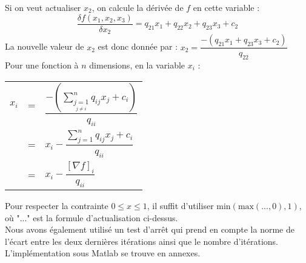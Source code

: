 \documentclass[12pt, a4paper]{report}
\begin{document}
Si on veut actualiser $x_2$, on calcule la dérivée de $f$ en cette variable :
\[\dfrac{\delta f(x_1,x_2,x_3)}{\delta x_2} = q_{21}x_1 + q_{22}x_2 + q_{23}x_3 + c_2\]
La nouvelle valeur de $x_2$ est donc donnée par :
\(x_2 = \dfrac{-(q_{21}x_1 + q_{23}x_3 + c_2)}{q_{22}}\) \\
Pour une fonction à $n$ dimensions, en la variable $x_i$ :\\
\begin{center}
\begin{tabular}{rcl}
$x_i$ & = & $\dfrac{-\left(\sum\limits_{\underset{j \neq i}{j = 1}}^n q_{ij}x_j + c_i\right)}{q_{ii}}$ \\
 & = & $x_i - \dfrac{\sum\limits_{j = 1}^nq_{ij}x_j + c_i}{q_{ii}}$ \\
 & = & $x_i - \dfrac{\left[\nabla f\right]_i}{q_{ii}}$ \\
\end{tabular}
\end{center}

Pour respecter la contrainte $0 \leq x \leq 1$, il suffit d'utiliser \(\text{min}(\text{max}(..., 0), 1)\), où "..." est la formule d'actualisation ci-dessus. \\

Nous avons également utilisé un test d'arrêt qui prend en compte la norme de l'écart entre les deux dernières itérations ainsi que le nombre d'itérations. \\
L'implémentation sous Matlab se trouve en annexes.
\end{document}
